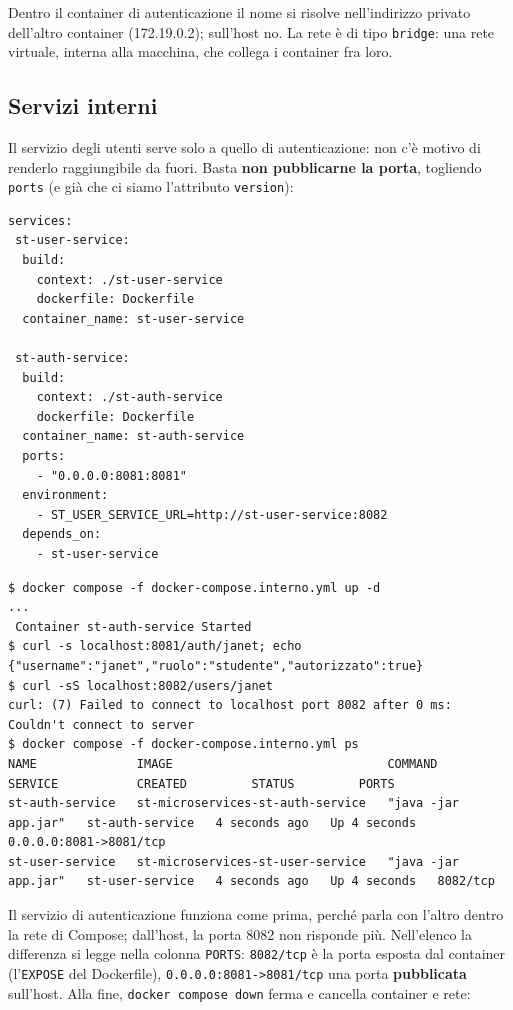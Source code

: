 Dentro il container di autenticazione il nome si risolve nell'indirizzo privato dell'altro container (172.19.0.2);
sull'host no. La rete è di tipo \texttt{bridge}: una rete virtuale, interna alla macchina, che collega i container fra
loro.

\subsection{Servizi interni}

Il servizio degli utenti serve solo a quello di autenticazione: non c'è motivo di renderlo raggiungibile da fuori.
Basta \textbf{non pubblicarne la porta}, togliendo \texttt{ports} (e già che ci siamo l'attributo \texttt{version}):

\begin{lstlisting}[style=yaml, name=st-microservices/docker-compose.interno.yml]
services:
 st-user-service:
  build:
    context: ./st-user-service
    dockerfile: Dockerfile
  container_name: st-user-service

 st-auth-service:
  build:
    context: ./st-auth-service
    dockerfile: Dockerfile
  container_name: st-auth-service
  ports:
    - "0.0.0.0:8081:8081"
  environment:
    - ST_USER_SERVICE_URL=http://st-user-service:8082
  depends_on:
    - st-user-service
\end{lstlisting}

\begin{lstlisting}[style=shell, name=Terminale]
$ docker compose -f docker-compose.interno.yml up -d
...
 Container st-auth-service Started
$ curl -s localhost:8081/auth/janet; echo
{"username":"janet","ruolo":"studente","autorizzato":true}
$ curl -sS localhost:8082/users/janet
curl: (7) Failed to connect to localhost port 8082 after 0 ms: Couldn't connect to server
$ docker compose -f docker-compose.interno.yml ps
NAME              IMAGE                              COMMAND               SERVICE           CREATED         STATUS         PORTS
st-auth-service   st-microservices-st-auth-service   "java -jar app.jar"   st-auth-service   4 seconds ago   Up 4 seconds   0.0.0.0:8081->8081/tcp
st-user-service   st-microservices-st-user-service   "java -jar app.jar"   st-user-service   4 seconds ago   Up 4 seconds   8082/tcp
\end{lstlisting}

Il servizio di autenticazione funziona come prima, perché parla con l'altro dentro la rete di Compose; dall'host, la
porta 8082 non risponde più. Nell'elenco la differenza si legge nella colonna \texttt{PORTS}: \texttt{8082/tcp} è la
porta esposta dal container (l'\texttt{EXPOSE} del Dockerfile), \texttt{0.0.0.0:8081->8081/tcp} una porta
\textbf{pubblicata} sull'host. Alla fine, \texttt{docker compose down} ferma e cancella container e rete:

